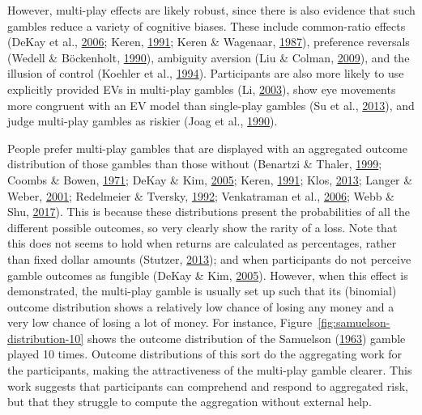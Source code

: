 \documentclass[
  english,
  man, donotrepeattitle,floatsintext]{apa7}
\theoremstyle{definition}
\theoremstyle{definition}
\theoremstyle{definition}
\theoremstyle{definition}
\theoremstyle{remark}
\begin{document}
However, multi-play effects are likely robust, since there is also evidence that
such gambles reduce a variety of cognitive biases. These include common-ratio
effects (DeKay et al., \protect\hyperlink{ref-dekay2006}{2006}; Keren, \protect\hyperlink{ref-keren1991}{1991}; Keren \& Wagenaar, \protect\hyperlink{ref-keren1987}{1987}), preference reversals
(Wedell \& Böckenholt, \protect\hyperlink{ref-wedell1990}{1990}), ambiguity aversion (Liu \& Colman, \protect\hyperlink{ref-liu2009}{2009}), and the illusion of control
(Koehler et al., \protect\hyperlink{ref-koehler1994}{1994}). Participants are also more likely to use explicitly provided EVs
in multi-play gambles (Li, \protect\hyperlink{ref-li2003}{2003}), show eye movements more congruent with an EV
model than single-play gambles (Su et al., \protect\hyperlink{ref-su2013}{2013}), and judge multi-play gambles as
riskier (Joag et al., \protect\hyperlink{ref-joag1990}{1990}).

People prefer multi-play gambles that are displayed with an aggregated outcome
distribution of those gambles than those without (Benartzi \& Thaler, \protect\hyperlink{ref-benartzi1999}{1999}; Coombs \& Bowen, \protect\hyperlink{ref-coombs1971}{1971}; DeKay \& Kim, \protect\hyperlink{ref-dekay2005}{2005}; Keren, \protect\hyperlink{ref-keren1991}{1991}; Klos, \protect\hyperlink{ref-klos2013}{2013}; Langer \& Weber, \protect\hyperlink{ref-langer2001}{2001}; Redelmeier \& Tversky, \protect\hyperlink{ref-redelmeier1992}{1992}; Venkatraman et al., \protect\hyperlink{ref-venkatraman2006}{2006}; Webb \& Shu, \protect\hyperlink{ref-webb2017}{2017}). This is because these distributions
present the probabilities of all the different possible outcomes, so very
clearly show the rarity of a loss. Note that this does not seems to hold when
returns are calculated as percentages, rather than fixed dollar amounts
(Stutzer, \protect\hyperlink{ref-stutzer2013}{2013}); and when participants do not perceive gamble outcomes as
fungible (DeKay \& Kim, \protect\hyperlink{ref-dekay2005}{2005}). However, when this effect is demonstrated, the multi-play
gamble is usually set up such that its (binomial) outcome distribution shows a
relatively low chance of losing any money and a very low chance of losing a lot
of money. For instance, Figure~\ref{fig:samuelson-distribution-10} shows the
outcome distribution of the Samuelson (\protect\hyperlink{ref-samuelson1963}{1963}) gamble played 10 times. Outcome
distributions of this sort do the aggregating work for the participants, making
the attractiveness of the multi-play gamble clearer. This work suggests that
participants can comprehend and respond to aggregated risk, but that they
struggle to compute the aggregation without external help.
\end{document}
